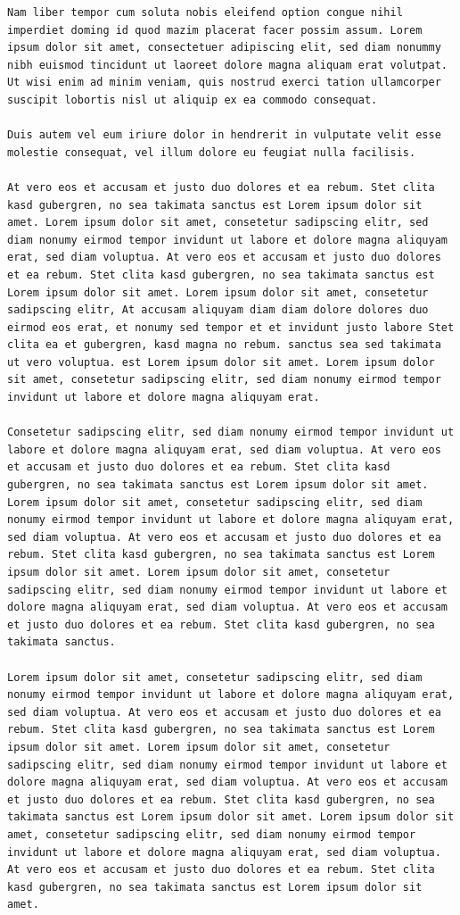 \begin{lstlisting}
Nam liber tempor cum soluta nobis eleifend option congue nihil imperdiet doming id quod mazim placerat facer possim assum. Lorem ipsum dolor sit amet, consectetuer adipiscing elit, sed diam nonummy nibh euismod tincidunt ut laoreet dolore magna aliquam erat volutpat. Ut wisi enim ad minim veniam, quis nostrud exerci tation ullamcorper suscipit lobortis nisl ut aliquip ex ea commodo consequat.

Duis autem vel eum iriure dolor in hendrerit in vulputate velit esse molestie consequat, vel illum dolore eu feugiat nulla facilisis.

At vero eos et accusam et justo duo dolores et ea rebum. Stet clita kasd gubergren, no sea takimata sanctus est Lorem ipsum dolor sit amet. Lorem ipsum dolor sit amet, consetetur sadipscing elitr, sed diam nonumy eirmod tempor invidunt ut labore et dolore magna aliquyam erat, sed diam voluptua. At vero eos et accusam et justo duo dolores et ea rebum. Stet clita kasd gubergren, no sea takimata sanctus est Lorem ipsum dolor sit amet. Lorem ipsum dolor sit amet, consetetur sadipscing elitr, At accusam aliquyam diam diam dolore dolores duo eirmod eos erat, et nonumy sed tempor et et invidunt justo labore Stet clita ea et gubergren, kasd magna no rebum. sanctus sea sed takimata ut vero voluptua. est Lorem ipsum dolor sit amet. Lorem ipsum dolor sit amet, consetetur sadipscing elitr, sed diam nonumy eirmod tempor invidunt ut labore et dolore magna aliquyam erat.

Consetetur sadipscing elitr, sed diam nonumy eirmod tempor invidunt ut labore et dolore magna aliquyam erat, sed diam voluptua. At vero eos et accusam et justo duo dolores et ea rebum. Stet clita kasd gubergren, no sea takimata sanctus est Lorem ipsum dolor sit amet. Lorem ipsum dolor sit amet, consetetur sadipscing elitr, sed diam nonumy eirmod tempor invidunt ut labore et dolore magna aliquyam erat, sed diam voluptua. At vero eos et accusam et justo duo dolores et ea rebum. Stet clita kasd gubergren, no sea takimata sanctus est Lorem ipsum dolor sit amet. Lorem ipsum dolor sit amet, consetetur sadipscing elitr, sed diam nonumy eirmod tempor invidunt ut labore et dolore magna aliquyam erat, sed diam voluptua. At vero eos et accusam et justo duo dolores et ea rebum. Stet clita kasd gubergren, no sea takimata sanctus.

Lorem ipsum dolor sit amet, consetetur sadipscing elitr, sed diam nonumy eirmod tempor invidunt ut labore et dolore magna aliquyam erat, sed diam voluptua. At vero eos et accusam et justo duo dolores et ea rebum. Stet clita kasd gubergren, no sea takimata sanctus est Lorem ipsum dolor sit amet. Lorem ipsum dolor sit amet, consetetur sadipscing elitr, sed diam nonumy eirmod tempor invidunt ut labore et dolore magna aliquyam erat, sed diam voluptua. At vero eos et accusam et justo duo dolores et ea rebum. Stet clita kasd gubergren, no sea takimata sanctus est Lorem ipsum dolor sit amet. Lorem ipsum dolor sit amet, consetetur sadipscing elitr, sed diam nonumy eirmod tempor invidunt ut labore et dolore magna aliquyam erat, sed diam voluptua. At vero eos et accusam et justo duo dolores et ea rebum. Stet clita kasd gubergren, no sea takimata sanctus est Lorem ipsum dolor sit amet.


\end{lstlisting}
